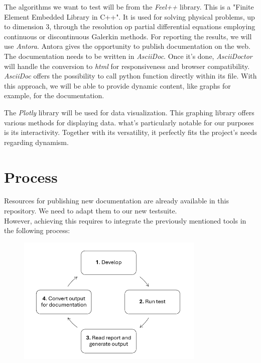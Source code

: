 \documentclass[12pt]{article}
\begin{document}
The algorithms we want to test will be from the \textit{Feel++}\cite*{Feelpp} library.
This is a "Finite Element Embedded Library in C++". It is used for solving physical problems, up to dimension 3,
through the resolution op partial differential equations employing continuous or discontinuous Galerkin methods.
\newpage
For reporting the results, we will use \textit{Antora}\cite*{Antora}. Antora gives the opportunity to publish documentation on the web.
The documentation needs to be written in \textit{AsciiDoc}. Once it's done, \textit{AsciiDoctor} will handle the conversion to \textit{html}
for responsiveness and browser compatibility.
\textit{AsciiDoc} offers the possibility to call python function directly within its file. With this approach, we will be able to provide dynamic content,
like graphs for example, for the documentation.

The \textit{Plotly}\cite*{Plotly} library will be used for data visualization. This graphing library offers various methods for displaying data.
what's particularly notable for our purposes is its interactivity. Together with its versatility, it perfectly fits the project's needs
regarding dynamism.


\section{Process}
Resources for publishing new documentation are already available in this repository. We need to adapt them to our new testsuite.\\
However, achieving this requires to integrate the previously mentioned tools in the following process:

\begin{figure}[h]
    \centering
    \includegraphics[width=0.8\textwidth]{../../illustrations/process.png}
\end{figure}
\end{document}
